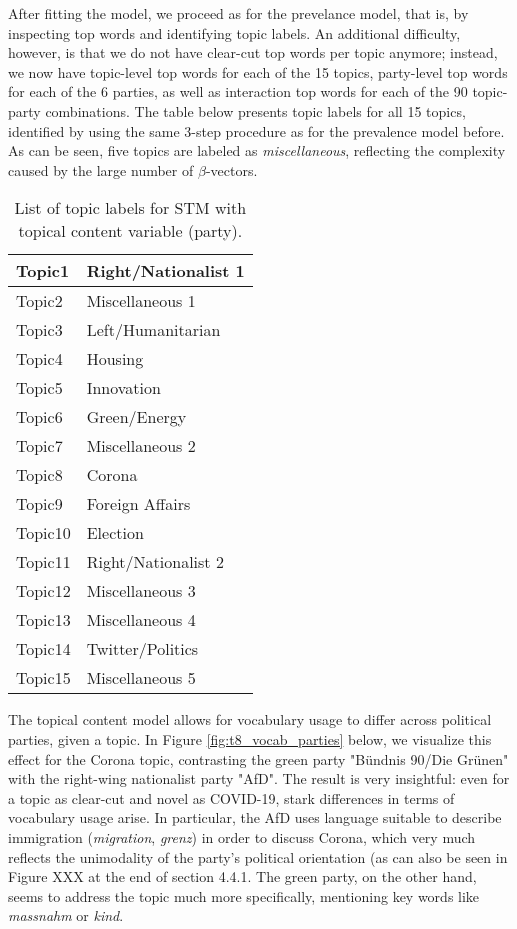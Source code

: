 \documentclass[12pt]{article}
\begin{document}
After fitting the model, we proceed as for the prevelance model, that is, by inspecting top words and identifying topic labels. An additional difficulty, however, is that we do not have clear-cut top words per topic anymore; instead, we now have topic-level top words for each of the 15 topics, party-level top words for each of the 6 parties, as well as interaction top words for each of the 90 topic-party combinations. The table below presents topic labels for all 15 topics, identified by using the same 3-step procedure as for the prevalence model before. As can be seen, five topics are labeled as \textit{miscellaneous}, reflecting the complexity caused by the large number of $\beta$-vectors.

\begin{table}[h!]
	\centering
	\captionsetup{justification=centering,margin=2cm}
	\begin{tabular}{|l|l|}
	\hline
	Topic1  & Right/Nationalist 1  \\ \hline
	Topic2  & Miscellaneous 1      \\ \hline
	Topic3  & Left/Humanitarian    \\ \hline
	Topic4  & Housing       	   \\ \hline
	Topic5  & Innovation           \\ \hline
	Topic6  & Green/Energy         \\ \hline
	Topic7  & Miscellaneous 2      \\ \hline
	Topic8  & Corona               \\ \hline
	Topic9  & Foreign Affairs      \\ \hline
	Topic10 & Election             \\ \hline
	Topic11 & Right/Nationalist 2  \\ \hline
	Topic12 & Miscellaneous 3      \\ \hline
	Topic13 & Miscellaneous 4      \\ \hline
	Topic14 & Twitter/Politics     \\ \hline
	Topic15 & Miscellaneous 5      \\ \hline
	\end{tabular}
	\caption{List of topic labels for STM with topical content variable (party).}
	\label{Tab:labels_content}
\end{table}

The topical content model allows for vocabulary usage to differ across political parties, given a topic. In Figure \ref{fig:t8_vocab_parties} below, we visualize this effect for the Corona topic, contrasting the green party "Bündnis 90/Die Grünen" with the right-wing nationalist party "AfD". The result is very insightful: even for a topic as clear-cut and novel as COVID-19, stark differences in terms of vocabulary usage arise. In particular, the AfD uses language suitable to describe immigration (\textit{migration}, \textit{grenz}) in order to discuss Corona, which very much reflects the unimodality of the party's political orientation (as can also be seen in Figure XXX at the end of section 4.4.1. The green party, on the other hand, seems to address the topic much more specifically, mentioning key words like \textit{massnahm} or \textit{kind}.
\end{document}
